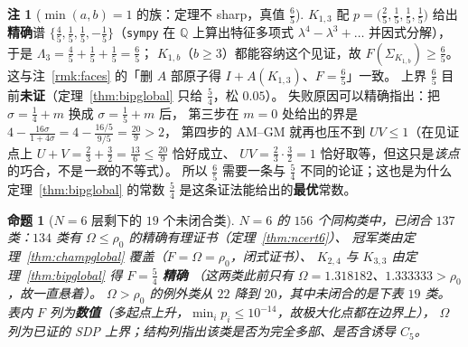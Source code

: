 \documentclass[UTF8,11pt]{ctexart}
\newtheorem{proposition}[theorem]{命题}
\theoremstyle{definition}
\newtheorem{remark}[theorem]{注}
\newcommand{\Lam}{\Lambda}
\newcommand{\Q}{\mathbb{Q}}
\begin{document}
\begin{remark}[$\min(a,b)=1$ 的族：定理不 sharp，真值 $\frac65$]\label{rmk:k1b}
$K_{1,3}$ 配 $p=\bigl(\frac25,\frac15,\frac15,\frac15\bigr)$ 给出\textbf{精确}谱
$\bigl\{\frac45,\frac15,\frac15,-\frac15\bigr\}$（\texttt{sympy} 在 $\Q$ 上算出特征多项式
$\lambda^4-\lambda^3+\dots$ 并因式分解），于是 $\Lam_3=\frac45+\frac15+\frac15=\frac65$；
$K_{1,b}$（$b\ge3$）都能容纳这个见证，故 $F(\Sigma_{K_{1,b}})\ge\frac65$。
这与注~\ref{rmk:faces} 的「删 $A$ 部原子得 $I+A(K_{1,3})$、$F=\frac65$」一致。
上界 $\frac65$ 目前\textbf{未证}（定理~\ref{thm:bipglobal} 只给 $\frac54$，松 $0.05$）。
失败原因可以精确指出：把 $\sigma=\frac14+m$ 换成 $\sigma=\frac15+m$ 后，
第三步在 $m=0$ 处给出的界是 $4-\frac{16\sigma}{1+4\sigma}=4-\frac{16/5}{9/5}=\frac{20}9>2$，
第四步的 AM--GM 就再也压不到 $UV\le1$（在见证点上 $U+V=\frac23+\frac32=\frac{13}6\le\frac{20}9$ 恰好成立、
$UV=\frac23\cdot\frac32=1$ 恰好取等，但这只是\emph{该点}的巧合，不是\emph{一致}的不等式）。
所以 $\frac65$ 需要一条与 $\frac54$ 不同的论证；这也是为什么定理~\ref{thm:bipglobal}
的常数 $\frac54$ 是这条证法能给出的\textbf{最优}常数。
\end{remark}

\begin{proposition}[$N=6$ 层剩下的 $19$ 个未闭合类]\label{prop:tab19}
$N=6$ 的 $156$ 个同构类中，已闭合 $137$ 类：$134$ 类有 $\Omega\le\rho_0$ 的精确有理证书（定理~\ref{thm:ncert6}）、
冠军类由定理~\ref{thm:champglobal} 覆盖（$F=\Omega=\rho_0$，闭式证书）、
$K_{2,4}$ 与 $K_{3,3}$ 由定理~\ref{thm:bipglobal} 得 $F=\frac54$ \textbf{精确}
（这两类此前只有 $\Omega=1.318182$、$1.333333>\rho_0$，故一直悬着）。
$\Omega>\rho_0$ 的例外类从 $22$ 降到 $20$，其中未闭合的是下表 $19$ 类。
表内 $F$ 列为\textbf{数值}（多起点上升，$\min_ip_i\le10^{-14}$，故极大化点都在边界上），
$\Omega$ 列为已证的 SDP 上界；结构列指出该类是否为完全多部、是否含诱导 $C_5$。
\end{proposition}
\end{document}
